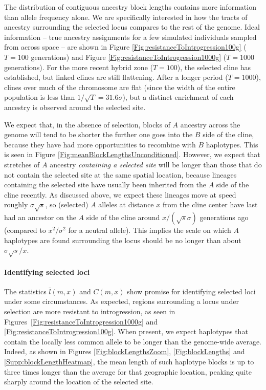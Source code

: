 \documentclass[11pt,letterpaper]{article}
\newcommand{\plr}[1]{{\em \color{blue} #1}}
\begin{document}
The distribution of contiguous ancestry block lengths contains more information than allele frequency alone. 
We are specifically interested in how the tracts of ancestry surrounding the selected locus compares to the rest of the genome. 
Ideal information -- true ancestry assignments for a few simulated individuals sampled from across space -- %
are shown in Figure \ref{Fig:resistanceToIntrogression100g} ($T=100$ generations) and Figure \ref{Fig:resistanceToIntrogression1000g} ($T=1000$ generations).
For the more recent hybrid zone ($T=100$), the selected cline has established,
but linked clines are still flattening.
After a longer period ($T=1000$),
clines over much of the chromosome are flat
(since the width of the entire population is less than $1/\sqrt{T}=31.6\sigma$),
but a distinct enrichment of each ancestry is observed around the selected site.

We expect that, in the absence of selection, blocks of $A$ ancestry across the genome 
will tend to be shorter the further one goes into the $B$ side of the cline,
because they have had more opportunities to recombine with $B$ haplotypes. 
This is seen in Figure \ref{Fig:meanBlockLengthsUnconditioned}.
However, we expect that stretches of $A$ ancestry \emph{containing a selected site} will be longer
than those that do not contain the selected site at the same spatial location,
because lineages containing the selected site have usually been inherited from the $A$ side of the cline recently. 
As discussed above, we expect these lineages move at speed roughly $\sigma\sqrt{s}$,
so (selected) $A$ alleles at distance $x$ from the cline center
have last had an ancestor on the $A$ side of the cline around $x/(\sqrt{s}\sigma)$ generations ago 
(compared to $x^2/\sigma^2$ for a neutral allele).
This implies the scale on which $A$ haplotypes are found surrounding the locus should be no longer than about $\sigma\sqrt{s}/x$.

\paragraph{Identifying selected loci}
The statistics $\bar l(m,x)$ and $C(m,x)$ show promise for identifying selected loci under some circumstances.
As expected, regions surrounding a locus under selection are more resistant to introgression,
as seen in Figures~\ref{Fig:resistanceToIntrogression1000g} and \ref{Fig:resistanceToIntrogression100g}.
When present, we expect haplotypes that contain the locally less common allele
to be longer than the genome-wide average.
Indeed,
as shown in Figures \ref{Fig:blockLengthsZoom}, \ref{Fig:blockLengths} and \ref{Supp:blockLengthHeatmap},
the mean length of such haplotype blocks is up to three times longer
than the average for that geographic location,
peaking quite sharply around the location of the selected site.
\end{document}
